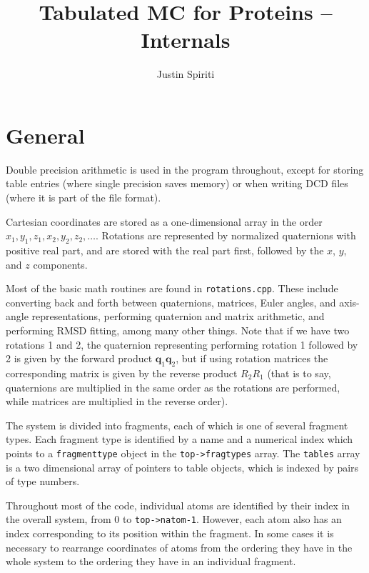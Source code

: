 \documentclass{article}      %
\title{Tabulated MC for Proteins -- Internals}  %
\author{Justin Spiriti}      %
\begin{document}

\maketitle                   %

\section{General}

Double precision arithmetic is used in the program throughout, except for storing table entries (where single precision saves memory) or when writing DCD files (where it is part of the file format).

Cartesian coordinates are stored as a one-dimensional array in the order $x_1, y_1, z_1, x_2, y_2, z_2, \dots$.  Rotations are represented by normalized quaternions with positive real part, and are stored with the real part first, followed by the $x$, $y$, and $z$ components.  

Most of the basic math routines are found in \verb+rotations.cpp+.  These include converting back and forth between quaternions, matrices, Euler angles, and axis-angle representations, performing quaternion and matrix arithmetic, and performing RMSD fitting, among many other things.  Note that if we have two rotations 1 and 2, the quaternion representing performing rotation 1 followed by 2 is given by the forward product $\mathbf{q}_1 \mathbf{q}_2$, but if using rotation matrices the corresponding matrix is given by the reverse product  $R_2 R_1$ (that is to say, quaternions are multiplied in the same order as the rotations are performed, while matrices are multiplied in the reverse order).  

The system is divided into fragments, each of which is one of several fragment types.  Each fragment type is identified by a name and a numerical index which points to a \verb+fragmenttype+ object in the \verb+top->fragtypes+ array.  The \verb+tables+ array is a two dimensional array of pointers to table objects, which is indexed by pairs of type numbers.  

Throughout most of the code, individual atoms are identified by their index in the overall system, from 0 to \verb+top->natom-1+.  However, each atom also has an index corresponding to its position within the fragment.  In some cases it is necessary to rearrange coordinates of atoms from the ordering they have in the whole system to the ordering they have in an individual fragment.  
\end{document}
